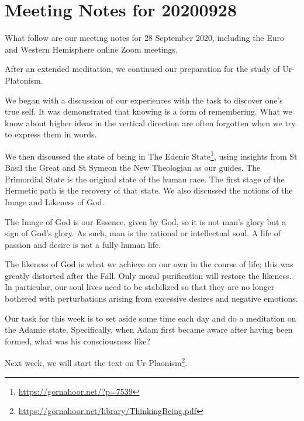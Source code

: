 \section{Meeting Notes for 20200928}

What follow are our meeting notes for 28 September 2020, including the Euro and Western Hemisphere online Zoom meetings.

After an extended meditation, we continued our preparation for the study of Ur-Platonism.

We began with a discussion of our experiences with the task to discover one's true self. It was demonstrated that knowing is a form of remembering. What we know about higher ideas in the vertical direction are often forgotten when we try to express them in words.

We then discussed the state of being in The Edenic State\footnote{\url{https://gornahoor.net/?p=7539}}, using insights from St Basil the Great and St Symeon the New Theologian as our guides. The Primordial State is the original state of the human race. The first stage of the Hermetic path is the recovery of that state. We also discussed the notions of the Image and Likeness of God.

The Image of God is our Essence, given by God, so it is not man's glory but a sign of God's glory. As such, man is the rational or intellectual soul. A life of passion and desire is not a fully human life.

The likeness of God is what we achieve on our own in the course of life; this was greatly distorted after the Fall. Only moral purification will restore the likeness. In particular, our soul lives need to be stabilized so that they are no longer bothered with perturbations arising from excessive desires and negative emotions.

Our task for this week is to set aside some time each day and do a meditation on the Adamic state. Specifically, when Adam first became aware after having been formed, what was his consciousness like?

Next week, we will start the text on Ur-Plaonism\footnote{\url{https://gornahoor.net/library/ThinkingBeing.pdf}}.



